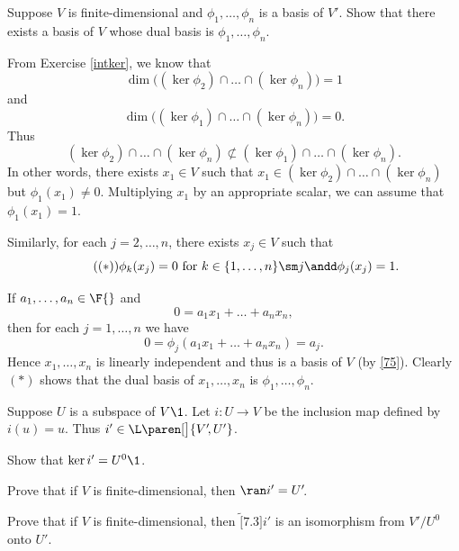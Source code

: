 \exercise
Suppose $V$ is finite-dimensional and $\phi_1, \dots, \phi_n$ is a basis of $V'\!$. Show that there exists a basis of $V$ whose dual basis is $\phi_1, \dots, \phi_n$.

\begin{Solution}
From Exercise \ref{intker}, we know that
\[
\dim \bigl( (\ker \phi_2) \cap \dots \cap (\ker \phi_n)\bigr) = 1
\]
and
\[
\dim \bigl( (\ker \phi_1) \cap \dots \cap (\ker \phi_n)\bigr) = 0.
\]
Thus
\[
(\ker \phi_2) \cap \dots \cap (\ker \phi_n) \nsubset (\ker \phi_1) \cap \dots \cap (\ker \phi_n).
\]
In other words, there exists $x_1 \in V$ such that $x_1 \in (\ker \phi_2) \cap \dots \cap (\ker \phi_n)$ but $\phi_1(x_1) \ne 0$. Multiplying $x_1$ by an appropriate scalar, we can assume that $\phi_1(x_1) = 1$.

Similarly, for each $j = 2, \dots, n$, there exists $x_j \in V$ such that
\[ \tag{$(*)$}
\phi_k(x_j) = 0 \text{\ for\ }
k \in \{1, \dots, n\} \sm j \andd \phi_j(x_j) = 1.
\]

If $a_1, \dots, a_n \in \F{}$ and
\[
0 = a_1 x_1 + \dots + a_n x_n,
\]
then for each $j = 1, \dots, n$ we have
\[
0 = \phi_j(a_1 x_1 + \dots + a_n x_n) = a_j.
\]
Hence $x_1, \dots, x_n$ is linearly independent and thus is a basis of $V$ (by \ref{75}). Clearly $(*)$ shows that the dual basis of $x_1, \dots, x_n$ is $\phi_1, \dots, \phi_n$.
\end{Solution}

\exercise
Suppose $U$ is a subspace of $V\1$. Let $i \colon U \to V$ be the inclusion map defined by $i(u) = u$. Thus
$i' \in \L\paren[\big]{V'\!, U'}$.
\begin{subtheorem}
\item
Show that $\ker i' = U^0\1$.
\item
Prove that if $V$ is finite-dimensional, then $\ran i' = U'\!$.
\item
Prove that if $V$ is finite-dimensional, then $\tilde[7.3]{i'}$ is an isomorphism from $V'\!/U^0$ onto $U'\!$.
\end{subtheorem}

